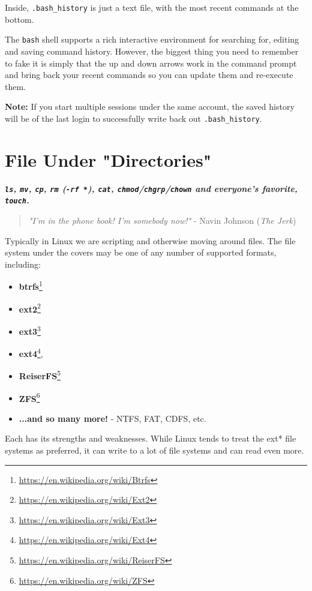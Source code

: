 \documentclass[10pt,american,]{book}
\renewcommand{\href}[2]{#2\footnote{\url{#1}}}
\numberwithin{figure}{chapter}
\begin{document}
Inside, \texttt{.bash\_history} is just a text file, with the most
recent commands at the bottom.

The \texttt{bash} shell supports a rich interactive environment for
searching for, editing and saving command history. However, the biggest
thing you need to remember to fake it is simply that the up and down
arrows work in the command prompt and bring back your recent commands so
you can update them and re-execute them.

\textbf{Note:} If you start multiple sessions under the same account,
the saved history will be of the last login to successfully write back
out \texttt{.bash\_history}.

\hypertarget{file-under-directories}{\chapter{File Under
"Directories"}\label{file-under-directories}}

\textbf{\emph{\texttt{ls}, \texttt{mv}, \texttt{cp}, \texttt{rm}
(\texttt{-rf\ *}), \texttt{cat},
\texttt{chmod}/\texttt{chgrp}/\texttt{chown} and everyone's favorite,
\texttt{touch}.}}

\begin{quote}
\emph{"I'm in the phone book! I'm somebody now!"} - Navin Johnson
(\emph{The Jerk})
\end{quote}

Typically in Linux we are scripting and otherwise moving around files.
The file system under the covers may be one of any number of supported
formats, including:

\begin{itemize}
\item
  \href{https://en.wikipedia.org/wiki/Btrfs}{\textbf{btrfs}}
\item
  \href{https://en.wikipedia.org/wiki/Ext2}{\textbf{ext2}}
\item
  \href{https://en.wikipedia.org/wiki/Ext3}{\textbf{ext3}}
\item
  \href{https://en.wikipedia.org/wiki/Ext4}{\textbf{ext4}},
\item
  \href{https://en.wikipedia.org/wiki/ReiserFS}{\textbf{ReiserFS}}
\item
  \href{https://en.wikipedia.org/wiki/ZFS}{\textbf{ZFS}}
\item
  \textbf{...and so many more!} - NTFS, FAT, CDFS, etc.
\end{itemize}

Each has its strengths and weaknesses. While Linux tends to treat the
ext* file systems as preferred, it can write to a lot of file systems
and can read even more.
\end{document}
